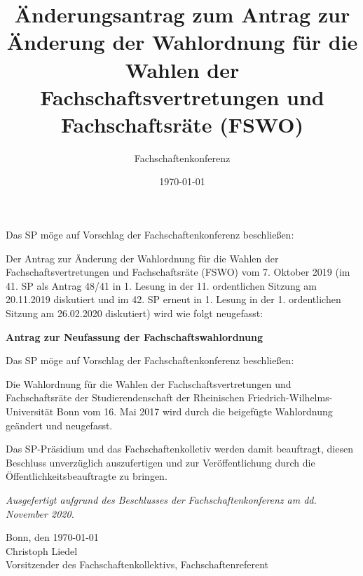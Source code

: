 \documentclass[DIV=12, parskip=half, fontsize=12pt, a4paper]{scrartcl}
\title{Änderungsantrag zum Antrag zur Änderung der Wahlordnung für die Wahlen der Fachschaftsvertretungen und Fachschaftsräte (FSWO)}
\author{Fachschaftenkonferenz}
\date{\today}
\begin{document}
	\maketitle
	Das SP möge auf Vorschlag der Fachschaftenkonferenz beschließen:

	\begin{linenumbers}
		Der Antrag zur Änderung der Wahlordnung für die Wahlen der Fachschaftsvertretungen und Fachschaftsräte (FSWO) vom 7. Oktober 2019 (im 41. SP als Antrag 48/41 in 1. Lesung in der 11. ordentlichen Sitzung am 20.11.2019 diskutiert und im 42. SP erneut in 1. Lesung in der 1. ordentlichen Sitzung am 26.02.2020 diskutiert) wird wie folgt neugefasst:

		\begin{center}\bfseries\LARGE Antrag zur Neufassung der Fachschaftswahlordnung
		\end{center}

		Das SP möge auf Vorschlag der Fachschaftenkonferenz beschließen:

		Die Wahlordnung für die Wahlen der Fachschaftsvertretungen und Fachschaftsräte der Studierendenschaft der Rheinischen Friedrich-Wilhelms-Universität Bonn vom 16. Mai 2017 wird durch die beigefügte Wahlordnung geändert und neugefasst.

		Das  SP-Präsidium und das Fachschaftenkolletiv  werden  damit  beauftragt,  diesen Beschluss unverzüglich auszufertigen und zur Veröffentlichung durch die Öffentlichkeitsbeauftragte zu bringen.
	\end{linenumbers}

	\vspace{1em}
	\textit{Ausgefertigt aufgrund des Beschlusses der Fachschaftenkonferenz am dd. November 2020.}

	Bonn, den \today \\
	Christoph Liedel \\
	{\scriptsize Vorsitzender des Fachschaftenkollektivs, Fachschaftenreferent}

	\clearpage
	
\end{document}
